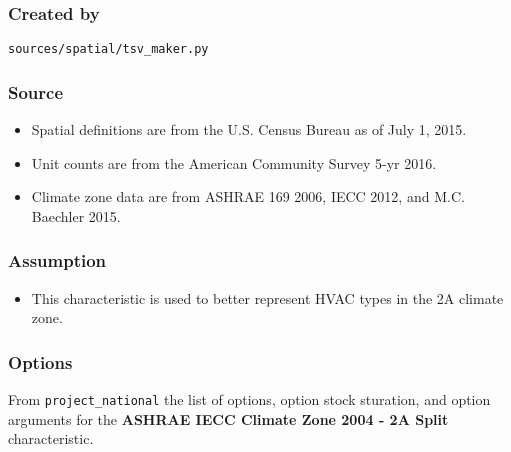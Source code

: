 \subsubsection{Created by}\label{created-by-3}

\texttt{sources/spatial/tsv\_maker.py}

\subsubsection{Source}\label{source-3}

\begin{itemize}
 
\item
  Spatial definitions are from the U.S. Census Bureau as of July 1,
  2015.
\item
  Unit counts are from the American Community Survey 5-yr 2016.
\item
  Climate zone data are from ASHRAE 169 2006, IECC 2012, and M.C.
  Baechler 2015.
\end{itemize}

\subsubsection{Assumption}\label{assumption-1}

\begin{itemize}
 
\item
  This characteristic is used to better represent HVAC types in the 2A
  climate zone.
\end{itemize}

\subsubsection{Options}\label{options-3}

From \texttt{project\_national} the list of options, option stock
sturation, and option arguments for the \textbf{ASHRAE IECC Climate Zone
2004 - 2A Split} characteristic.


